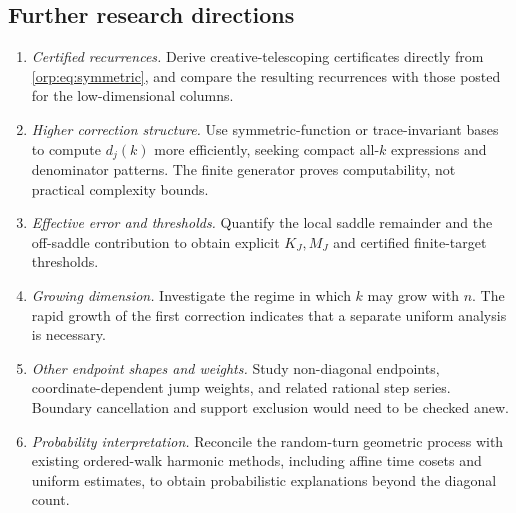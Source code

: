 \documentclass[11pt]{article}
\theoremstyle{remark}\newtheorem{remark}[theorem]{Remark}
\begin{document}
\subsection{Further research directions}
\begin{enumerate}[label=\arabic*.]
\item \emph{Certified recurrences.} Derive creative-telescoping certificates directly from \eqref{orp:eq:symmetric}, and compare the resulting recurrences with those posted for the low-dimensional columns.
\item \emph{Higher correction structure.} Use symmetric-function or trace-invariant bases to compute $d_j(k)$ more efficiently, seeking compact all-$k$ expressions and denominator patterns. The finite generator proves computability, not practical complexity bounds.
\item \emph{Effective error and thresholds.} Quantify the local saddle remainder and the off-saddle contribution to obtain explicit $K_J,M_J$ and certified finite-target thresholds.
\item \emph{Growing dimension.} Investigate the regime in which $k$ may grow with $n$. The rapid growth of the first correction indicates that a separate uniform analysis is necessary.
\item \emph{Other endpoint shapes and weights.} Study non-diagonal endpoints, coordinate-dependent jump weights, and related rational step series. Boundary cancellation and support exclusion would need to be checked anew.
\item \emph{Probability interpretation.} Reconcile the random-turn geometric process with existing ordered-walk harmonic methods, including affine time cosets and uniform estimates, to obtain probabilistic explanations beyond the diagonal count.
\end{enumerate}
\end{document}
